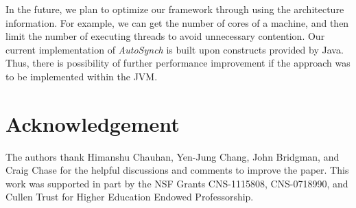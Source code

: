 \documentclass{sigplanconf}
\begin{document}

In the future, we plan to optimize our framework through using the architecture
information. For example, we can get the number of cores of a machine, and
then limit the number of executing threads to avoid unnecessary contention. Our 
current implementation of {\em AutoSynch} is built upon constructs provided 
by Java. Thus, there is possibility of further performance improvement if the 
approach was to be implemented within the JVM. 

\section*{Acknowledgement}
The authors thank Himanshu Chauhan, Yen-Jung Chang, John Bridgman, and Craig 
Chase for the helpful discussions and comments to improve the paper. This work 
was supported in part by the NSF Grants  CNS-1115808, CNS-0718990, and Cullen 
Trust for Higher Education Endowed Professorship.
\end{document}
